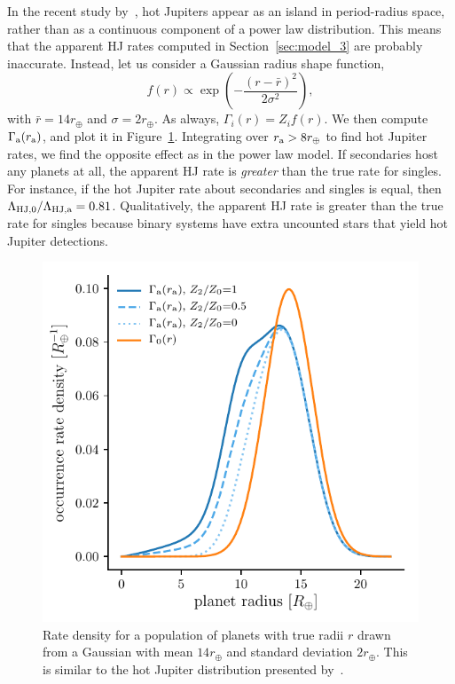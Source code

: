 \documentclass[12pt,modern]{aastex61}
\renewcommand{\a}{_{\rm a}}
\begin{document}
In the recent study by~\citet{petigura_CKS_2017}, hot Jupiters appear
as an island in period-radius space, rather than as a continuous
component of a power law distribution.  This means that the apparent
HJ rates computed in Section~\ref{sec:model_3} are probably
inaccurate.  Instead, let us consider a Gaussian radius shape
function,
\begin{equation}
    f(r) \propto \exp \left( -\frac{(r-\bar{r})^2}{2\sigma^2} \right),
\end{equation}
with $\bar{r} = 14r_\oplus$ and $\sigma = 2r_\oplus$.  As always,
$\Gamma_i(r) = Z_i f(r)$.  We then compute $\Gamma\a(r\a)$, and plot
it in Figure~\ref{fig:gaussian_HJ}.  Integrating over $r\a >
8r_\oplus$ to find hot Jupiter rates, we find the opposite effect as
in the power law model.  If secondaries host any planets at all, the
apparent HJ rate is {\it greater} than the true rate for singles.  For
instance, if the hot Jupiter rate about secondaries and singles
is equal, then $\Lambda_{{\rm HJ},0}/\Lambda_{\rm HJ,a} = 0.81$.
Qualitatively, the apparent HJ rate is greater than the true rate for
singles because binary systems have extra uncounted stars that
yield hot Jupiter detections.


\begin{figure}[!tb]
    \centering
    \includegraphics[width=.6\textwidth]{figures/int_rate_density_vs_radius_model_7_rpu_22.5_manyZs.pdf}
    \caption{
        Rate density for a population of planets with true radii $r$
        drawn from a Gaussian with mean $14r_\oplus$ and standard
        deviation $2r_\oplus$.  This is similar to the hot Jupiter
        distribution presented by~\citet{petigura_CKS_2017}.
    }
    \label{fig:gaussian_HJ}
\end{figure}
\end{document}
